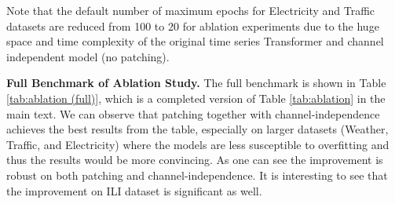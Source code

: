 \documentclass{article} \usepackage{iclr2023_conference,times}
\begin{document}
Note that the default number of maximum epochs for Electricity and Traffic datasets are reduced from 100 to 20 for ablation experiments due to the huge space and time complexity of the original time series Transformer and channel independent model (no patching).


\textbf{Full Benchmark of Ablation Study.}
The full benchmark is shown in Table \ref{tab:ablation (full)}, which is a completed version of Table \ref{tab:ablation} in the main text. We can observe that patching together with channel-independence achieves the best results from the table, especially on larger datasets (Weather, Traffic, and Electricity) where the models are less susceptible to overfitting and thus the results would be more convincing. As one can see the improvement is robust on both patching and channel-independence. It is interesting to see that the improvement on ILI dataset is significant as well.
\end{document}
